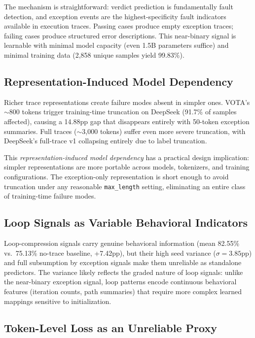 \documentclass[11pt,a4paper]{article}
\begin{document}
The mechanism is straightforward: verdict prediction is fundamentally fault detection, and exception events are the highest-specificity fault indicators available in execution traces.
Passing cases produce empty exception traces; failing cases produce structured error descriptions.
This near-binary signal is learnable with minimal model capacity (even 1.5B parameters suffice) and minimal training data (2,858 unique samples yield 99.83\%).

\subsection{Representation-Induced Model Dependency}

Richer trace representations create failure modes absent in simpler ones.
VOTA's ${\sim}$800 tokens trigger training-time truncation on DeepSeek (91.7\% of samples affected), causing a 14.88pp gap that disappears entirely with 50-token exception summaries.
Full traces (${\sim}$3,000 tokens) suffer even more severe truncation, with DeepSeek's full-trace v1 collapsing entirely due to label truncation.

This \emph{representation-induced model dependency} has a practical design implication: simpler representations are more portable across models, tokenizers, and training configurations.
The exception-only representation is short enough to avoid truncation under any reasonable \texttt{max\_length} setting, eliminating an entire class of training-time failure modes.

\subsection{Loop Signals as Variable Behavioral Indicators}

Loop-compression signals carry genuine behavioral information (mean 82.55\% vs.\ 75.13\% no-trace baseline, +7.42pp), but their high seed variance ($\sigma = 3.85$pp) and full subsumption by exception signals make them unreliable as standalone predictors.
The variance likely reflects the graded nature of loop signals: unlike the near-binary exception signal, loop patterns encode continuous behavioral features (iteration counts, path summaries) that require more complex learned mappings sensitive to initialization.

\subsection{Token-Level Loss as an Unreliable Proxy}
\end{document}
